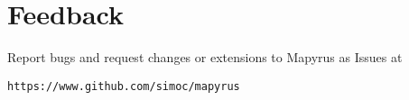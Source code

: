 \section{Feedback}

Report bugs and request changes or extensions to Mapyrus as
Issues at

\begin{alltt}
https://www.github.com/simoc/mapyrus
\end{alltt}
